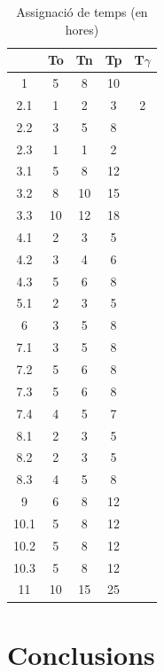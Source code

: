 \documentclass[10pt,a4paper,twocolumn,twoside]{article}
\begin{document}
\begin{table}
\caption{Assignació de temps (en hores)}
\label{tab:taulaTemps}

\begin{center}
\begin{tabular}{ |c|c|c|c|c| }
\hline
     & To & Tn & Tp & T$\gamma$ \\ \hline
     1   & 5  & 8  & 10 &    \\ \hline
     \hline
     2.1 & 1  & 2  & 3  & 2  \\ \hline
     2.2 & 3  & 5  & 8  &    \\ \hline
     2.3 & 1  & 1  & 2  &    \\ \hline
     \hline
     3.1 & 5  & 8  & 12 &    \\ \hline
     3.2 & 8  & 10 & 15 &    \\ \hline
     3.3 & 10 & 12 & 18 &    \\ \hline
     \hline
     4.1 & 2  & 3  & 5  &    \\ \hline
     4.2 & 3  & 4  & 6  &    \\ \hline
     4.3 & 5  & 6  & 8  &    \\ \hline
     \hline
     5.1 & 2  & 3  & 5  &    \\ \hline
     \hline
     6   & 3  & 5  & 8  &    \\ \hline
     \hline
     7.1 & 3  & 5  & 8  &    \\ \hline
     7.2 & 5  & 6  & 8  &    \\ \hline
     7.3 & 5  & 6  & 8  &    \\ \hline
     7.4 & 4  & 5  & 7  &    \\ \hline
     \hline
     8.1 & 2  & 3  & 5  &    \\ \hline
     8.2 & 2  & 3  & 5  &    \\ \hline
     8.3 & 4  & 5  & 8  &    \\ \hline
     \hline
     9   & 6  & 8  & 12 &    \\ \hline
     \hline
    10.1 & 5  & 8  & 12 &    \\ \hline
    10.2 & 5  & 8  & 12 &    \\ \hline
    10.3 & 5  & 8  & 12 &    \\ \hline
     \hline
     11 & 10 & 15 & 25 &    \\ \hline
\end{tabular}
\end{center}
\end{table}

\section{Conclusions}
\end{document}
